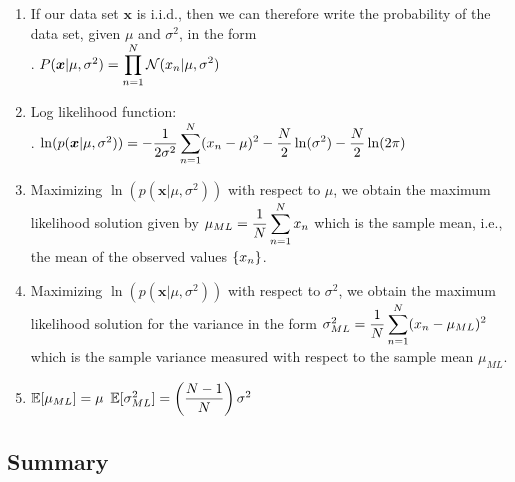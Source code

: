 \begin{enumerate}
    \item If our data set $\bm{x}$ is i.i.d., then we can therefore write the probability of the data set, given $\mu$  and $\sigma^2$, in the form
    \hfill \cite{ml/book/Pattern-Recognition-And-Machine-Learning/Christopher-M-Bishop}
    \\
    .\hfill
    $
        P(\bm{x}|\mu , \sigma^2)
        = \displaystyle\prod^{N}_{n=1} \mathcal{N} (x_n|\mu , \sigma^2)
    $
    \hfill \cite{ml/book/Pattern-Recognition-And-Machine-Learning/Christopher-M-Bishop}

    \item Log likelihood function:
    \hfill \cite{ml/book/Pattern-Recognition-And-Machine-Learning/Christopher-M-Bishop}
    \\
    .\hfill
    $
        \ln (p (\bm{x}|\mu , \sigma ^2))
        = - \dfrac{1}{2\sigma ^2} \displaystyle\sum^N_{n=1} (x_n - \mu )^2 - \dfrac{N }{2} \ln (\sigma ^2) - \dfrac{N }{2} \ln(2\pi)
    $
    \hfill \cite{ml/book/Pattern-Recognition-And-Machine-Learning/Christopher-M-Bishop}

    \item Maximizing $\ln (p (\bm{x}|\mu , \sigma ^2))$ with respect to $\mu$, we obtain the maximum likelihood solution given by
    $
        \mu_{ML}
        = \dfrac{1}{N} \displaystyle\sum_{n=1}^N x_n
    $
    which is the sample mean, i.e., the mean of the observed values $\left\{x_n\right\}$.
    \hfill \cite{ml/book/Pattern-Recognition-And-Machine-Learning/Christopher-M-Bishop}

    \item Maximizing $\ln (p (\bm{x}|\mu , \sigma ^2))$ with respect to $\sigma^2$, we obtain the maximum likelihood solution for the variance in the form
    $
        \sigma^2 _{ML} = \dfrac{1}{N} \displaystyle\sum^N _{n=1} (x_n - \mu _{ML})^2
    $
    which is the sample variance measured with respect to the sample mean $\mu _{ML}$.
    \hfill \cite{ml/book/Pattern-Recognition-And-Machine-Learning/Christopher-M-Bishop}

    \item
    $\mathbb{E}[\mu _{ML}] = \mu $
    \hfill
    $\mathbb{E}[\sigma ^2_{ML}] = \left(\dfrac{N - 1}{N}\right) \sigma ^2$
    \hfill \cite{ml/book/Pattern-Recognition-And-Machine-Learning/Christopher-M-Bishop}
\end{enumerate}







\subsection{Summary}

